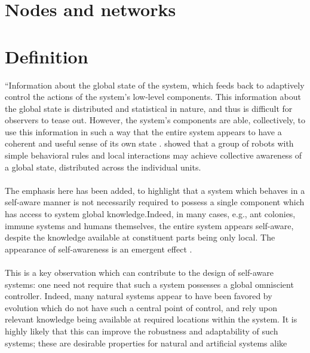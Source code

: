 \documentclass{article}
\begin{document}
	
	
	\section{Nodes and networks}
		\cite{agne-2016-self-aware-compute-nodes}
	
	\section{Definition}
		“Information about the global state of the system, which feeds back to adaptively control the actions of the system’s low-level components. This information about the global state is distributed and statistical in nature, and thus is difficult for observers to tease out. However, the system’s components are able, collectively, to use this information in such a way that the entire system appears to have a coherent and useful sense of its own state \citep{mitchell-2005-self-awareness-and-control-in-decentralized-systems}. \cite{schmickl-2011-cocoro-the-self-aware-underwater-swarm} showed that a group of robots with simple behavioral rules
		and local interactions may achieve collective awareness of a global state, distributed across the individual units.
		
		\paragraph{} The emphasis here has been added, to highlight that a system which behaves in a self-aware manner is not necessarily required to possess a single component which has access to system global knowledge.Indeed, in many cases, e.g., ant colonies, immune systems and humans themselves, the entire system appears self-aware, despite the knowledge available at constituent parts being only local. The appearance of self-awareness is an emergent effect \citet{mitchell-2005-self-awareness-and-control-in-decentralized-systems}.
		\paragraph{} This is a key observation which can contribute to the design of self-aware systems: one need not require that such a system possesses a global omniscient controller. Indeed, many natural systems appear to have been favored
		by evolution which do not have such a central point of control, and rely upon relevant knowledge being available
		at required locations within the system. It is highly likely that this can improve the robustness and adaptability of
		such systems; these are desirable properties for natural and artificial systems alike
		
\end{document}
